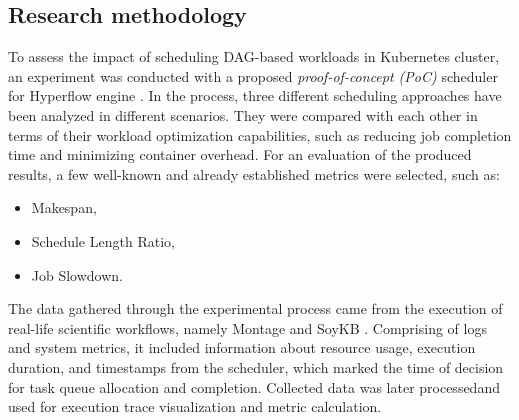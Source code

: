 \subsection{Research methodology}
\label{s:Introduction:Methodology}


To assess the impact of scheduling DAG-based workloads in Kubernetes cluster, an experiment was conducted with a proposed \emph{proof-of-concept (PoC)} scheduler for Hyperflow engine \cite{b:Hyperflow}.
In the process, three different scheduling approaches have been analyzed in different scenarios.
They were compared with each other in terms of their workload optimization capabilities, such as reducing job completion time and minimizing container overhead.
For an evaluation of the produced results, a few well-known and already established metrics were selected, such as:

\begin{itemize}
  \item Makespan,
  \item Schedule Length Ratio,
  \item Job Slowdown.
\end{itemize}

The data gathered through the experimental process came from the execution of real-life scientific workflows,
namely Montage \cite{b:Montage} and SoyKB \cite{b:SoyKB-PGen}.
Comprising of logs and system metrics, it included information about resource usage, execution duration, and timestamps from the scheduler, which marked the time of decision for task queue allocation and completion.
Collected data was later processed\footnotemark[1] and used for execution trace visualization and metric calculation.


